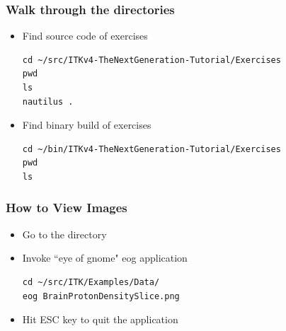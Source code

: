 \begin{frame}[fragile]
\frametitle{Walk through the directories}
\begin{itemize}
\item Find source code of exercises
\begin{verbatim}
cd ~/src/ITKv4-TheNextGeneration-Tutorial/Exercises
pwd
ls
nautilus .
\end{verbatim}
\pause
\item Find binary build of exercises
\begin{verbatim}
cd ~/bin/ITKv4-TheNextGeneration-Tutorial/Exercises
pwd
ls
\end{verbatim}
\end{itemize}
\end{frame}

\begin{frame}[fragile]
\frametitle{How to View Images}
\begin{itemize}
\item Go to the directory
\item Invoke ``eye of gnome" eog application
\begin{verbatim}
cd ~/src/ITK/Examples/Data/
eog BrainProtonDensitySlice.png
\end{verbatim}
\pause
\item Hit ESC key to quit the application
\end{itemize}
\end{frame}

